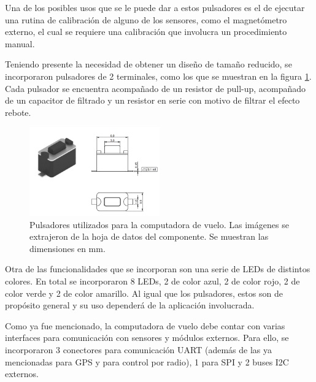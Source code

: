 Una de los posibles usos que se le puede dar a estos pulsadores es el de ejecutar una rutina de calibración de alguno de los sensores, como el magnetómetro externo, el cual se requiere una calibración que involucra un procedimiento manual.

Teniendo presente la necesidad de obtener un diseño de tamaño reducido, se incorporaron pulsadores de 2 terminales, como los que se muestran en la figura \ref{fig:pulsadores}. Cada pulsador se encuentra acompañado de un resistor de pull-up, acompañado de un capacitor de filtrado y un resistor en serie con motivo de filtrar el efecto rebote.

\begin{figure}[H]
    \centering
    \includegraphics[width=0.5\textwidth]{img/pulsadores.png}
    \caption{Pulsadores utilizados para la computadora de vuelo. Las imágenes se extrajeron de la hoja de datos del componente. Se muestran las dimensiones en mm.}
    \label{fig:pulsadores}    
\end{figure}



Otra de las funcionalidades que se incorporan son una serie de LEDs de distintos colores. En total se incorporaron 8 LEDs, 2 de color azul, 2 de color rojo, 2 de color verde y 2 de color amarillo. Al igual que los pulsadores, estos son de propósito general y su uso dependerá de la aplicación involucrada.

Como ya fue mencionado, la computadora de vuelo debe contar con varias interfaces para comunicación con sensores y módulos externos. Para ello, se incorporaron 3 conectores para comunicación UART (además de las ya mencionadas para GPS y para control por radio), 1 para SPI y 2 buses I2C externos.

